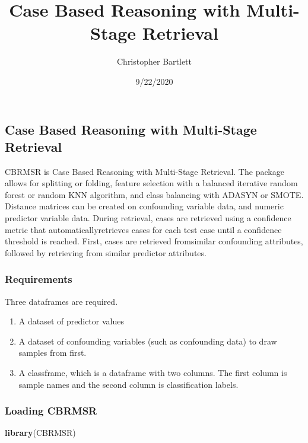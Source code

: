 \documentclass[
]{article}
\title{Case Based Reasoning with Multi-Stage Retrieval}
\author{Christopher Bartlett}
\date{9/22/2020}
\newenvironment{Shaded}{\begin{snugshade}}{\end{snugshade}}
\newcommand{\KeywordTok}[1]{\textcolor[rgb]{0.13,0.29,0.53}{\textbf{#1}}}
\newcommand{\NormalTok}[1]{#1}
\providecommand{\tightlist}{%
  \setlength{\itemsep}{0pt}\setlength{\parskip}{0pt}}
\begin{document}
\maketitle

\hypertarget{case-based-reasoning-with-multi-stage-retrieval}{%
\subsection{Case Based Reasoning with Multi-Stage
Retrieval}\label{case-based-reasoning-with-multi-stage-retrieval}}

CBRMSR is Case Based Reasoning with Multi-Stage Retrieval. The package
allows for splitting or folding, feature selection with a balanced
iterative random forest or random KNN algorithm, and class balancing
with ADASYN or SMOTE. Distance matrices can be created on confounding
variable data, and numeric predictor variable data. During retrieval,
cases are retrieved using a confidence metric that
automaticallyretrieves cases for each test case until a confidence
threshold is reached. First, cases are retrieved fromsimilar confounding
attributes, followed by retrieving from similar predictor attributes.

\hypertarget{requirements}{%
\subsubsection{Requirements}\label{requirements}}

Three dataframes are required.

\begin{enumerate}
\def\labelenumi{\arabic{enumi}.}
\tightlist
\item
  A dataset of predictor values
\item
  A dataset of confounding variables (such as confounding data) to draw
  samples from first.
\item
  A classframe, which is a dataframe with two columns. The first column
  is sample names and the second column is classification labels.
\end{enumerate}

\hypertarget{loading-cbrmsr}{%
\subsubsection{Loading CBRMSR}\label{loading-cbrmsr}}

\begin{Shaded}
\begin{Highlighting}[]
 \KeywordTok{library}\NormalTok{(CBRMSR)}
\end{Highlighting}
\end{Shaded}
\end{document}
